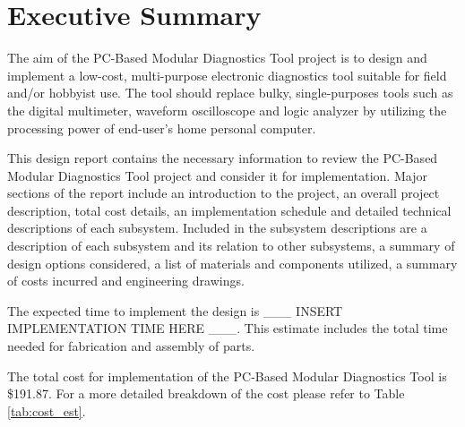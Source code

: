 \section*{Executive Summary}
The aim of the PC-Based Modular Diagnostics Tool project is to design and implement
a low-cost, multi-purpose electronic diagnostics tool suitable for field and/or
hobbyist use. The tool should replace bulky, single-purposes tools such as the digital 
multimeter, waveform oscilloscope and logic analyzer by utilizing the processing
power of end-user's home personal computer.

This design report contains the necessary information to review the PC-Based Modular 
Diagnostics Tool project and consider it for implementation. Major sections of the
report include an introduction to the project, an overall project description,
total cost details, an implementation schedule and detailed technical descriptions of each
subsystem. Included in the subsystem descriptions are a description of each subsystem
and its relation to other subsystems, a summary of design options considered, a list 
of materials and components utilized, a summary of costs incurred and engineering drawings.

The expected time to implement the design is \_\_\_ INSERT IMPLEMENTATION TIME HERE \_\_\_.
This estimate includes the total time needed for fabrication and assembly of parts.

The total cost for implementation of the PC-Based Modular Diagnostics Tool is \$191.87. For a more detailed breakdown of the cost please refer to Table \ref{tab:cost_est}.


